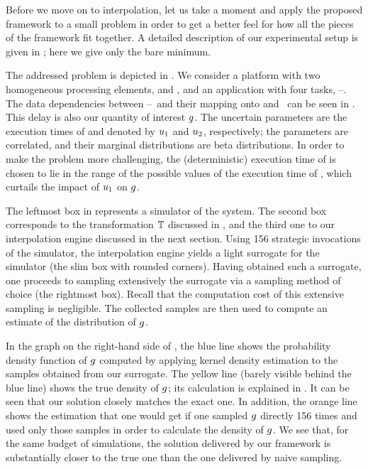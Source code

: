 Before we move on to interpolation, let us take a moment and apply the proposed
framework to a small problem in order to get a better feel for how all the
pieces of the framework fit together. A detailed description of our experimental
setup is given in ; here we give only the bare minimum.

\newcommand{\cores}{\token{PE1} and \token{PE2}}
\newcommand{\tasks}{\token{T1}--\token{T4}}
The addressed problem is depicted in . We consider a platform with
two homogeneous processing elements, \cores, and an application with four tasks,
\tasks. The data dependencies between \tasks\ and their mapping onto \cores\ can
be seen in . This delay is also our quantity of interest $g$. The
uncertain parameters are the execution times of  and 
denoted by $u_1$ and $u_2$, respectively; the parameters are correlated, and
their marginal distributions are beta distributions. In order to make the
problem more challenging, the (deterministic) execution time of  is
chosen to lie in the range of the possible values of the execution time of
, which curtails the impact of $u_1$ on $g$.

The leftmost box in  represents a simulator of the system. The
second box corresponds to the transformation $\mathbb{T}$ discussed in
, and the third one to our interpolation engine discussed in
the next section. Using 156 strategic invocations of the simulator, the
interpolation engine yields a light surrogate for the simulator (the slim box
with rounded corners). Having obtained such a surrogate, one proceeds to
sampling extensively the surrogate via a sampling method of choice (the
rightmost box). Recall that the computation cost of this extensive sampling is
negligible. The collected samples are then used to compute an estimate of the
distribution of $g$.

In the graph on the right-hand side of , the blue line shows the
probability density function of $g$ computed by applying kernel density
estimation to the samples obtained from our surrogate. The yellow line (barely
visible behind the blue line) shows the true density of $g$; its calculation is
explained in . It can be seen that our solution closely
matches the exact one. In addition, the orange line shows the estimation that
one would get if one sampled $g$ directly 156 times and used only those samples
in order to calculate the density of $g$. We see that, for the same budget of
simulations, the solution delivered by our framework is substantially closer to
the true one than the one delivered by naive sampling.
